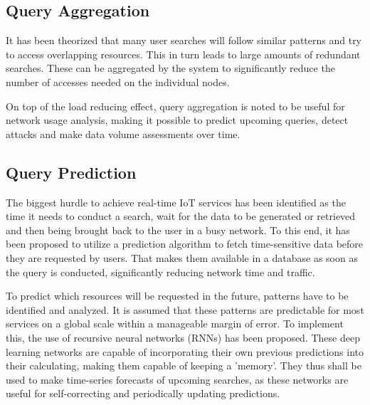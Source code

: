 \documentclass [journal]{IEEEtran}
\begin{document}
 \subsection{Query Aggregation}
It has been theorized that many user searches will follow similar patterns and try to access overlapping resources. This in turn leads to large amounts of redundant searches. These can be aggregated by the system to significantly reduce the number of accesses needed on the individual nodes. \par
On top of the load reducing effect, query aggregation is noted to be useful for network usage analysis, making it possible to predict upcoming queries, detect attacks and make data volume assessments over time.
 \subsection{Query Prediction}
The biggest hurdle to achieve real-time IoT services has been identified as the time it needs to conduct a search, wait for the data to be generated or retrieved and then being brought back to the user in a busy network. To this end, it has been proposed to utilize a prediction algorithm to fetch time-sensitive data before they are requested by users. That makes them available in a database as soon as the query is conducted, significantly reducing network time and traffic. \par
To predict which resources will be requested in the future, patterns have to be identified and analyzed. It is assumed that these patterns are predictable for most services on a global scale within a manageable margin of error. To implement this, the use of recursive neural networks (RNNs) has been proposed. These deep learning networks are capable of incorporating their own previous predictions into their calculating, making them capable of keeping a 'memory'. They thus shall be used to make time-series forecasts of upcoming searches, as these networks are useful for self-correcting and periodically updating predictions.
\end{document}
